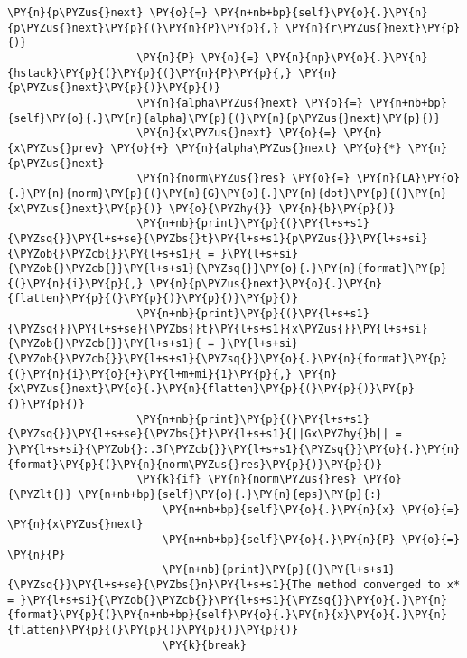 \begin{Verbatim}[commandchars=\\\{\}]
                    \PY{n}{p\PYZus{}next} \PY{o}{=} \PY{n+nb+bp}{self}\PY{o}{.}\PY{n}{p\PYZus{}next}\PY{p}{(}\PY{n}{P}\PY{p}{,} \PY{n}{r\PYZus{}next}\PY{p}{)}
                    \PY{n}{P} \PY{o}{=} \PY{n}{np}\PY{o}{.}\PY{n}{hstack}\PY{p}{(}\PY{p}{(}\PY{n}{P}\PY{p}{,} \PY{n}{p\PYZus{}next}\PY{p}{)}\PY{p}{)}
                    \PY{n}{alpha\PYZus{}next} \PY{o}{=} \PY{n+nb+bp}{self}\PY{o}{.}\PY{n}{alpha}\PY{p}{(}\PY{n}{p\PYZus{}next}\PY{p}{)}
                    \PY{n}{x\PYZus{}next} \PY{o}{=} \PY{n}{x\PYZus{}prev} \PY{o}{+} \PY{n}{alpha\PYZus{}next} \PY{o}{*} \PY{n}{p\PYZus{}next}
                    \PY{n}{norm\PYZus{}res} \PY{o}{=} \PY{n}{LA}\PY{o}{.}\PY{n}{norm}\PY{p}{(}\PY{n}{G}\PY{o}{.}\PY{n}{dot}\PY{p}{(}\PY{n}{x\PYZus{}next}\PY{p}{)} \PY{o}{\PYZhy{}} \PY{n}{b}\PY{p}{)}
                    \PY{n+nb}{print}\PY{p}{(}\PY{l+s+s1}{\PYZsq{}}\PY{l+s+se}{\PYZbs{}t}\PY{l+s+s1}{p\PYZus{}}\PY{l+s+si}{\PYZob{}\PYZcb{}}\PY{l+s+s1}{ = }\PY{l+s+si}{\PYZob{}\PYZcb{}}\PY{l+s+s1}{\PYZsq{}}\PY{o}{.}\PY{n}{format}\PY{p}{(}\PY{n}{i}\PY{p}{,} \PY{n}{p\PYZus{}next}\PY{o}{.}\PY{n}{flatten}\PY{p}{(}\PY{p}{)}\PY{p}{)}\PY{p}{)}
                    \PY{n+nb}{print}\PY{p}{(}\PY{l+s+s1}{\PYZsq{}}\PY{l+s+se}{\PYZbs{}t}\PY{l+s+s1}{x\PYZus{}}\PY{l+s+si}{\PYZob{}\PYZcb{}}\PY{l+s+s1}{ = }\PY{l+s+si}{\PYZob{}\PYZcb{}}\PY{l+s+s1}{\PYZsq{}}\PY{o}{.}\PY{n}{format}\PY{p}{(}\PY{n}{i}\PY{o}{+}\PY{l+m+mi}{1}\PY{p}{,} \PY{n}{x\PYZus{}next}\PY{o}{.}\PY{n}{flatten}\PY{p}{(}\PY{p}{)}\PY{p}{)}\PY{p}{)}
                    \PY{n+nb}{print}\PY{p}{(}\PY{l+s+s1}{\PYZsq{}}\PY{l+s+se}{\PYZbs{}t}\PY{l+s+s1}{||Gx\PYZhy{}b|| = }\PY{l+s+si}{\PYZob{}:.3f\PYZcb{}}\PY{l+s+s1}{\PYZsq{}}\PY{o}{.}\PY{n}{format}\PY{p}{(}\PY{n}{norm\PYZus{}res}\PY{p}{)}\PY{p}{)}
                    \PY{k}{if} \PY{n}{norm\PYZus{}res} \PY{o}{\PYZlt{}} \PY{n+nb+bp}{self}\PY{o}{.}\PY{n}{eps}\PY{p}{:}
                        \PY{n+nb+bp}{self}\PY{o}{.}\PY{n}{x} \PY{o}{=} \PY{n}{x\PYZus{}next}
                        \PY{n+nb+bp}{self}\PY{o}{.}\PY{n}{P} \PY{o}{=} \PY{n}{P}
                        \PY{n+nb}{print}\PY{p}{(}\PY{l+s+s1}{\PYZsq{}}\PY{l+s+se}{\PYZbs{}n}\PY{l+s+s1}{The method converged to x* = }\PY{l+s+si}{\PYZob{}\PYZcb{}}\PY{l+s+s1}{\PYZsq{}}\PY{o}{.}\PY{n}{format}\PY{p}{(}\PY{n+nb+bp}{self}\PY{o}{.}\PY{n}{x}\PY{o}{.}\PY{n}{flatten}\PY{p}{(}\PY{p}{)}\PY{p}{)}\PY{p}{)}
                        \PY{k}{break}
\end{Verbatim}

